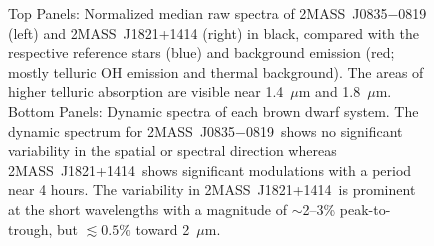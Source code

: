 \documentclass[twocolumn]{aastex6}
\newcommand{\sha}{2MASS~J0835$-$0819}
\newcommand{\shb}{2MASS~J1821+1414}
\begin{document}
\begin{figure}[!t]
\centering
{}
	\caption{Top Panels: Normalized median raw spectra of {\sha} (left) and {\shb} (right) in black, compared with the respective reference stars (blue) and background emission (red; mostly telluric OH emission and thermal background). The areas of higher telluric absorption are visible near 1.4~$\mu$m and 1.8~$\mu$m.  Bottom Panels: Dynamic spectra of each brown dwarf system. The dynamic spectrum for \sha\ shows no significant variability in the spatial or spectral direction whereas \shb\ shows significant modulations with a period near 4 hours.
The variability in \shb\ is prominent at the short wavelengths with a magnitude of $\sim$2--3\% peak-to-trough, but $\lesssim 0.5\%$ toward 2~$\mu$m.}
	\label{fig:specphot}
	\vspace{0.1in}
\end{figure} 
\end{document}
